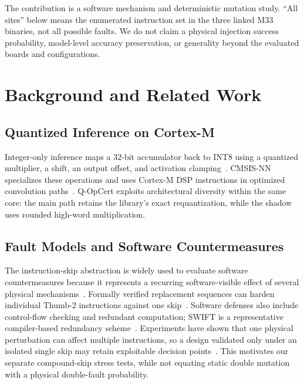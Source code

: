 \documentclass[conference]{IEEEtran}
\begin{document}
The contribution is a software mechanism and deterministic mutation study. ``All sites'' below means the enumerated instruction set in the three linked M33 binaries, not all possible faults. We do not claim a physical injection success probability, model-level accuracy preservation, or generality beyond the evaluated boards and configurations.

\section{Background and Related Work}
\subsection{Quantized Inference on Cortex-M}
Integer-only inference maps a 32-bit accumulator back to INT8 using a quantized multiplier, a shift, an output offset, and activation clamping~\cite{jacob2018quantization}. CMSIS-NN specializes these operations and uses Cortex-M DSP instructions in optimized convolution paths~\cite{lai2018cmsisnn,armcmsisnn,armcortexm4}. Q-OpCert exploits architectural diversity within the same core: the main path retains the library's exact requantization, while the shadow uses rounded high-word multiplication.

\subsection{Fault Models and Software Countermeasures}
The instruction-skip abstraction is widely used to evaluate software countermeasures because it represents a recurring software-visible effect of several physical mechanisms~\cite{barenghi2012fault,moro2014experimental}. Formally verified replacement sequences can harden individual Thumb-2 instructions against one skip~\cite{moro2014formal}. Software defenses also include control-flow checking and redundant computation; SWIFT is a representative compiler-based redundancy scheme~\cite{reis2005swift}. Experiments have shown that one physical perturbation can affect multiple instructions, so a design validated only under an isolated single skip may retain exploitable decision points~\cite{dutertre2021multiskip}. This motivates our separate compound-skip stress tests, while not equating static double mutation with a physical double-fault probability.
\end{document}
